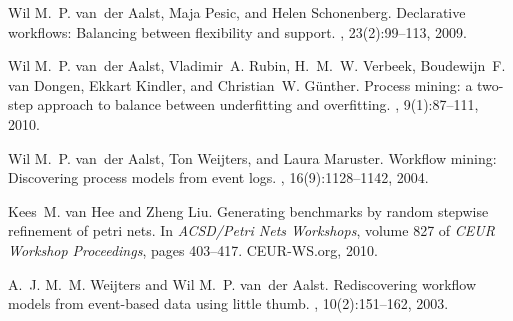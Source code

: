 \documentclass[a4wide,11pt]{article}
\theoremstyle{definition}
\theoremstyle{plain}
\begin{document}
\begin{thebibliography}{MWvdAvdB06}
Wil M.~P. van~der Aalst, Maja Pesic, and Helen Schonenberg.
\newblock Declarative workflows: Balancing between flexibility and support.
, 23(2):99--113, 2009.

Wil M.~P. van~der Aalst, Vladimir~A. Rubin, H.~M.~W. Verbeek, Boudewijn~F. van
  Dongen, Ekkart Kindler, and Christian~W. G{\"{u}}nther.
\newblock Process mining: a two-step approach to balance between underfitting
  and overfitting.
, 9(1):87--111, 2010.

Wil M.~P. van~der Aalst, Ton Weijters, and Laura Maruster.
\newblock Workflow mining: Discovering process models from event logs.
, 16(9):1128--1142, 2004.

Kees~M. van Hee and Zheng Liu.
\newblock Generating benchmarks by random stepwise refinement of petri nets.
\newblock In {\em ACSD/Petri Nets Workshops}, volume 827 of {\em {CEUR}
  Workshop Proceedings}, pages 403--417. CEUR-WS.org, 2010.

A.~J. M.~M. Weijters and Wil M.~P. van~der Aalst.
\newblock Rediscovering workflow models from event-based data using little
  thumb.
, 10(2):151--162, 2003.

\end{thebibliography}
\end{document}
